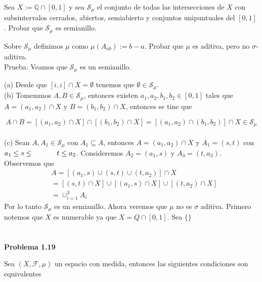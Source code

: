\documentclass[12pt]{article}
\begin{document}
    Sea $X := \mathbb{Q}\cap[0,1]$ y sea $\mathscr{S}_{\mu}$ el conjunto de todas las 
    intersecciones de $X$ con subsintervalos cerrados, abiertos, semiabierto y conjuntos 
    unipuntuales del $[0,1]$. Probar que $\mathscr{S}_{\mu}$ es semianillo.

    Sobre $\mathscr{S}_{\mu}$ definimos $\mu$ como $\mu(A_{ab}) := b-a$. Probar que $\mu$ es 
    aditiva, pero no $\sigma$-aditiva.
    \\

    Prueba: Veamos que $\mathscr{S}_{\mu}$ es un semianillo. 

    (a) Desde que $[i,i]\cap X = \emptyset$ tenemos que $\emptyset \in \mathscr{S}_{\mu}$.
     \\

    (b) Tomemmos $A,B\in \mathscr{S}_{\mu}$, entonces existen $a_1,a_2,b_1,b_2\in [0,1]$ 
    tales que $A = (a_1,a_2)\cap X$ \hspace*{33pt} y $B = (b_1,b_2)\cap X$, entonces se tine que 

    \[A\cap B = [(a_1,a_2)\cap X] \cap [(b_1,b_2)\cap X] = [(a_1,a_2)\cap (b_1,b_2)]\cap X \in \mathscr{S}_{\mu}\]
    \\

    (c) Sean $A,A_1\in \mathscr{S}_{\mu}$ con $A_1\subseteq A$, entonces $A = (a_1,a_2)\cap X$
    y $A_1 = (s,t)$ con $a_1 \leq s \leq \hspace*{33pt} t \leq a_2$. Consideremos $A_2 = (a_1,s)$ y 
    $A_3 = (t,a_3)$. Observemos que 
    \begin{equation*}
        \begin{aligned}
            & A = [(a_1,s)\cup(s,t)\cup(t,a_2)]\cap X \\
            & = [(s,t)\cap X]\cup[(a_1,s)\cap X]\cup[(t,a_2)\cap X] \\
            & = \cup_{i=1}^3 A_i
        \end{aligned}
    \end{equation*} 
    Por lo tanto $\mathscr{S}_{\mu}$ es un semianillo. Ahora veremos que $\mu$ no es $\sigma$
    aditiva. Primero notemos que $X$ es numerable ya que $X = Q\cap[0,1]$. Sea $\{\}$
    \\ \\ \\

    \textbf{Problema 1.19}

    Sea $(X,\mathcal{F},\mu)$ un espacio con medida, entonces las siguientes condiciones son 
    equivalentes
    \\
\end{document}
